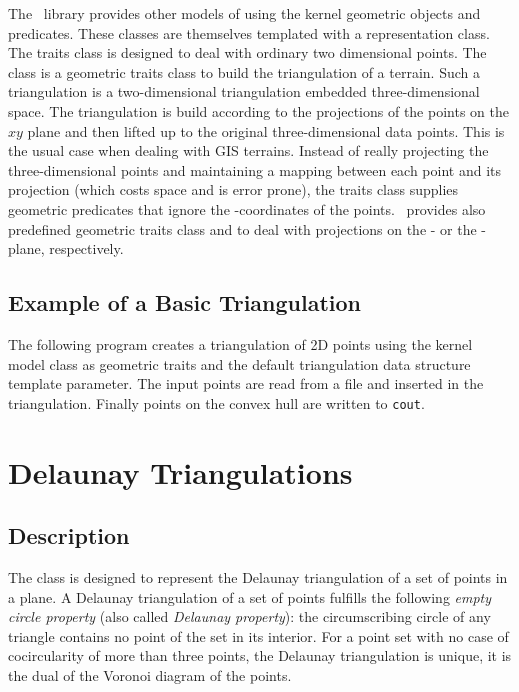 The \cgal\  library provides  other models
of  
using the kernel geometric objects and predicates.
These classes are themselves templated with a representation class. 
The traits class 
is designed to deal with ordinary  two dimensional points.
The class  
is a geometric traits class to build the triangulation
of a terrain. Such a triangulation is a two-dimensional
triangulation embedded  three-dimensional space.
The triangulation is 
build according to  the projections of the points
on the $xy$ plane  and then lifted up to the original
three-dimensional data points.
This is the usual case when dealing with GIS terrains.
Instead of really projecting the  three-dimensional points and
maintaining a mapping between each point and its projection
 (which costs space and is error prone),
the traits class  supplies geometric predicates that ignore the
-coordinates of the points.
\cgal\ provides also predefined geometric traits class
 and
 to
deal with projections on the
 - or  the -plane,
respectively.

\subsection{Example of a Basic Triangulation}
\label{Subsection_2D_Triangulations_Basic_Example}

The following program  creates a  triangulation of 2D points
using the kernel model class 
as geometric traits and the default triangulation data structure
template parameter.
 The input points are read from a file 
and inserted in the triangulation.
Finally points on the convex hull are written to {\tt cout}. 


\section{Delaunay Triangulations}
\label{Section_2D_Triangulations_Delaunay}

\subsection{Description}
\label{Subsection_2D_Triangulations_Delaunay_Description}
The class  is designed to represent
the Delaunay triangulation of a set of points in a plane.
A  Delaunay triangulation of a set of points
fulfills
the following {\em empty circle property} 
(also called {\em Delaunay property}): the circumscribing
circle of any triangle 
contains no point of the set in its interior.
For a point set with no case of cocircularity 
of more than three points,
the Delaunay triangulation is unique, it is  the dual
of the Voronoi diagram of the points.


